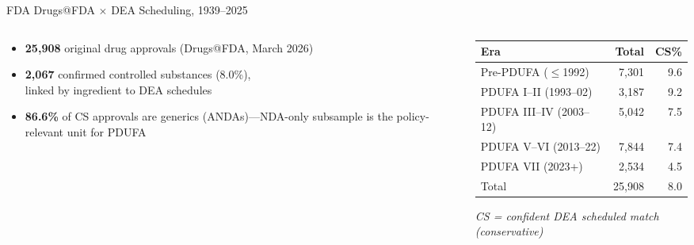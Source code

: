 \documentclass[10pt]{beamer}
\newcommand{\pdufahl}[1]{\textcolor{pdufacolor}{#1}}
\newcommand{\cshl}[1]{\textcolor{cscolor}{#1}}
\begin{document}
\begin{frame}{FDA Drugs@FDA $\times$ DEA Scheduling, 1939--2025}

  \begin{columns}[T]

    \begin{column}{0.48\textwidth}
      \begin{itemize}
        \item \textbf{25{,}908} original drug approvals
              (Drugs@FDA, March 2026)
        \item \textbf{\cshl{2{,}067}} confirmed
              \cshl{controlled substances} (8.0\%),\\
              linked by ingredient to DEA schedules
        \item \textbf{86.6\%} of \cshl{CS} approvals are generics
              (ANDAs)---NDA-only subsample is the
              policy-relevant unit for \pdufahl{PDUFA}
      \end{itemize}
    \end{column}

    \begin{column}{0.48\textwidth}
      \centering
      {\footnotesize
      \begin{tabular}{@{}lrr@{}}
        \toprule
        Era & Total & \cshl{CS}\% \\
        \midrule
        Pre-\pdufahl{PDUFA} ($\le$1992) & 7{,}301 & 9.6 \\
        \pdufahl{PDUFA} I--II (1993--02) & 3{,}187 & 9.2 \\
        \pdufahl{PDUFA} III--IV (2003--12) & 5{,}042 & 7.5 \\
        \pdufahl{PDUFA} V--VI (2013--22) & 7{,}844 & 7.4 \\
        \pdufahl{PDUFA} VII (2023+) & 2{,}534 & 4.5 \\
        \midrule
        Total & 25{,}908 & 8.0 \\
        \bottomrule
      \end{tabular}
      \par\vspace{0.4ex}
      {\tiny\textit{CS = confident DEA scheduled match (conservative)}}
      }
    \end{column}

  \end{columns}

\end{frame}
\end{document}
